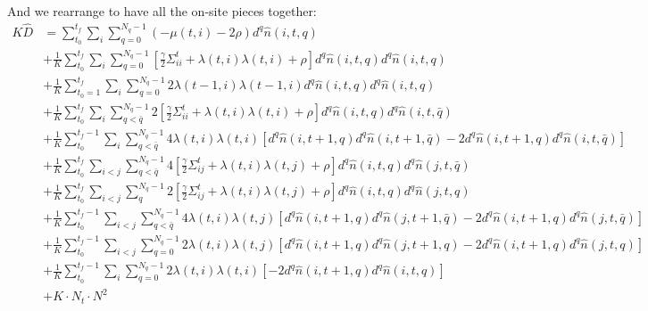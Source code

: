 \documentclass[12pt]{article}
\begin{document}
And we rearrange to have all the on-site pieces together:
\begin{align}
K\hat{D} &= \sum_{t_0}^{t_f} \sum_i \sum_{q=0}^{N_q-1} (-\mu(t,i) - 2\rho) d^q \hat{n}(i,t,q) \nonumber\\
&+ \frac{1}{K} \sum_{t_0}^{t_f} \sum_{i} \sum_{q=0}^{N_q-1} \left[ \frac{\gamma}{2} {\Sigma^t_{ii}} + \lambda(t,i)\lambda(t,i) + \rho \right] d^q \hat{n}(i,t,q) d^q \hat{n}(i,t,{q}) \nonumber\\
&+ \frac{1}{K} \sum_{t_0 = 1}^{t_f} \sum_{i} \sum_{q=0}^{N_q-1} 2\lambda(t-1,i)\lambda(t-1,i) d^q \hat{n}(i,t,q) d^q \hat{n}(i,t,{q}) \nonumber\\ 
%
%
&+ \frac{1}{K} \sum_{t_0}^{t_f} \sum_{i} \sum_{q<\bar{q}}^{N_q-1} 2\left[ \frac{\gamma}{2} {\Sigma^t_{ii}} + \lambda(t,i)\lambda(t,i) + \rho \right] d^q \hat{n}(i,t,q) d^q \hat{n}(i,t,\bar{q}) \nonumber\\
%
%
%
&+ \frac{1}{K} \sum_{t_0}^{t_f-1} \sum_{i} \sum_{q<\bar{q}}^{N_q-1}4\lambda(t,i)\lambda(t,i) \left[ d^q \hat{n}(i,t+1,q) d^q \hat{n}(i,t+1,\bar{q}) - 2 d^q \hat{n}(i,t+1,q) d^q \hat{n}(i,t,\bar{q}) \right] \nonumber\\    
&+ \frac{1}{K} \sum_{t_0}^{t_f} \sum_{i<j} \sum_{q<\bar{q}}^{N_q-1} 4\left[ \frac{\gamma}{2} {\Sigma^t_{ij}} + \lambda(t,i)\lambda(t,j) + \rho \right] d^q \hat{n}(i,t,q) d^q \hat{n}(j,t,\bar{q}) \nonumber\\
&+ \frac{1}{K} \sum_{t_0}^{t_f} \sum_{i<j} \sum_{q}^{N_q-1} 2\left[ \frac{\gamma}{2} {\Sigma^t_{ij}} + \lambda(t,i)\lambda(t,j) + \rho \right] d^q \hat{n}(i,t,q) d^q \hat{n}(j,t,q) \nonumber\\
&+ \frac{1}{K} \sum_{t_0}^{t_f-1} \sum_{i<j} \sum_{q<\bar{q}}^{N_q-1} 4\lambda(t,i)\lambda(t,j) \left[ d^q \hat{n}(i,t+1,q) d^q \hat{n}(j,t+1,\bar{q}) - 2 d^q \hat{n}(i,t+1,q) d^q \hat{n}(j,t,\bar{q}) \right] \nonumber\\    
&+ \frac{1}{K} \sum_{t_0}^{t_f-1} \sum_{i<j} \sum_{q=0}^{N_q-1} 2\lambda(t,i)\lambda(t,j) \left[ d^q \hat{n}(i,t+1,q) d^q \hat{n}(j,t+1,{q}) - 2 d^q \hat{n}(i,t+1,q) d^q \hat{n}(j,t,{q}) \right] \nonumber\\    
&+ \frac{1}{K} \sum_{t_0}^{t_f-1} \sum_{i} \sum_{q=0}^{N_q-1} 2\lambda(t,i)\lambda(t,i) \left[ - 2 d^q \hat{n}(i,t+1,q) d^q \hat{n}(i,t,{q}) \right] \nonumber\\ 
&+ K\cdot N_t\cdot N^2 
\end{align}


\begin{thebibliography}{10}
\end{thebibliography}
\end{document}
